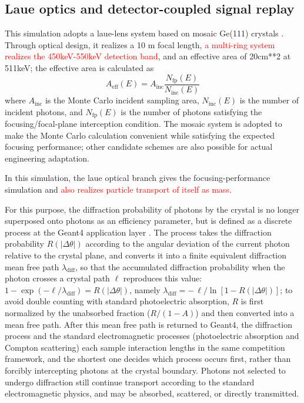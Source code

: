 \documentclass[pdflatex,sn-mathphys-num]{sn-jnl}
\begin{document}
\FloatBarrier

\subsection{Laue optics and detector-coupled signal replay}
\label{sec:optics}

This simulation adopts a laue-lens system based on mosaic Ge(111) crystals \cite{Barriere2009Laue,Barriere2011LauePrototype}. Through optical design, it realizes a 10 m focal length, \textcolor{red}{a multi-ring system realizes the 450keV-550keV detection band}, and an effective area of 20cm**2 at 511keV; the effective area is calculated as
\begin{equation}
  A_{\mathrm{eff}}(E)=A_{\mathrm{inc}}\frac{N_{\mathrm{fp}}(E)}{N_{\mathrm{inc}}(E)}
  \label{eq:laue_aeff}
\end{equation}
where $A_{\mathrm{inc}}$ is the Monte Carlo incident sampling area, $N_{\mathrm{inc}}(E)$ is the number of incident photons, and $N_{\mathrm{fp}}(E)$ is the number of photons satisfying the focusing/focal-plane interception condition.
The mosaic system is adopted to make the Monte Carlo calculation convenient while satisfying the expected focusing performance; other candidate schemes are also possible for actual engineering adaptation.

In this simulation, the laue optical branch gives the focusing-performance simulation and \textcolor{red}{also realizes particle transport of itself as mass}.

For this purpose, the diffraction probability of photons by the crystal is no longer superposed onto photons as an efficiency parameter, but is defined as a discrete process at the Geant4 application layer \cite{Agostinelli2003,Allison2016}. The process takes the diffraction probability $R(|\Delta\theta|)$ according to the angular deviation of the current photon relative to the crystal plane, and converts it into a finite equivalent diffraction mean free path $\lambda_{\mathrm{diff}}$, so that the accumulated diffraction probability when the photon crosses a crystal path $\ell$ reproduces this value: $1-\exp(-\ell/\lambda_{\mathrm{diff}})=R(|\Delta\theta|)$, namely $\lambda_{\mathrm{diff}}=-\,\ell/\ln[1-R(|\Delta\theta|)]$; to avoid double counting with standard photoelectric absorption, $R$ is first normalized by the unabsorbed fraction ($R/(1-A)$) and then converted into a mean free path. After this mean free path is returned to Geant4, the diffraction process and the standard electromagnetic processes (photoelectric absorption and Compton scattering) each sample interaction lengths in the same competition framework, and the shortest one decides which process occurs first, rather than forcibly intercepting photons at the crystal boundary. Photons not selected to undergo diffraction still continue transport according to the standard electromagnetic physics, and may be absorbed, scattered, or directly transmitted.
\end{document}
